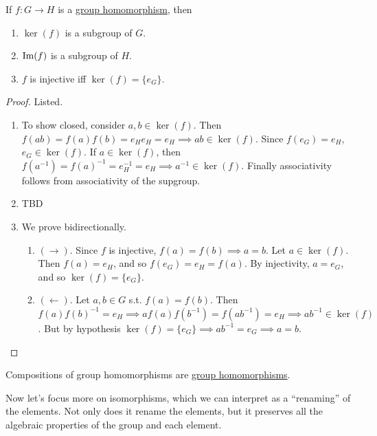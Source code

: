   \begin{theorem}
    \label{thm:kernels_subgroup}
    If $f: G \to H$ is a \hyperref[def:group-homomorphism]{group homomorphism}, then 
    \begin{enumerate}
      \item $\ker(f)$ is a subgroup of $G$.  
      \item $\operatorname{Im}(f)$ is a subgroup of $H$.  
      \item $f$ is injective iff $\ker(f) = \{e_G\}$. 
    \end{enumerate}
  \end{theorem}
  \begin{proof}
    Listed. 
    \begin{enumerate}
      \item To show closed, consider $a, b \in \ker(f)$. Then $f(ab) = f(a) f(b) = e_H e_H = e_H \implies ab \in \ker(f)$. Since $f(e_G) = e_H$, $e_G \in \ker(f)$. If $a \in \ker(f)$, then $f(a^{-1}) = f(a)^{-1} = e_H^{-1} = e_H \implies a^{-1} \in \ker(f)$. Finally associativity follows from associativity of the supgroup. 
      \item TBD 
      \item We prove bidirectionally. 
      \begin{enumerate}
        \item $(\rightarrow)$. Since $f$ is injective, $f(a) = f(b) \implies a = b$. Let $a \in \ker(f)$. Then $f(a) = e_H$, and so $f(e_G) = e_H = f(a)$. By injectivity, $a = e_G$, and so $\ker(f) = \{e_G\}$. 
        \item $(\leftarrow)$. Let $a, b \in G$ s.t. $f(a) = f(b)$. Then $f(a) f(b)^{-1} = e_H \implies af(a) f(b^{-1}) = f(a b^{-1}) = e_H \implies ab^{-1} \in \ker(f)$. But by hypothesis $\ker(f) = \{e_G\} \implies ab^{-1} = e_G \implies a = b$. 
      \end{enumerate}
    \end{enumerate}
  \end{proof}

  \begin{theorem}
    \label{thm:compositions-of-group-homomorphisms}
    Compositions of group homomorphisms are \hyperref[def:group-homomorphism]{group homomorphisms}. 
  \end{theorem}

  Now let's focus more on isomorphisms, which we can interpret as a ``renaming'' of the elements. Not only does it rename the elements, but it preserves all the algebraic properties of the group and each element. 

